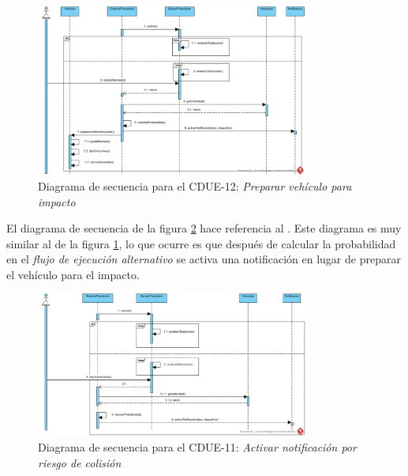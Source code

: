 \begin{figure}[h]
  \begin{center}
    \includegraphics[width=0.8\textwidth]{./img/diagramas_de_secuencia/CDUE-12.png}
  \end{center}
  \caption{Diagrama de secuencia para el CDUE-12: \textit{Preparar vehículo para impacto}}
  \label{img:prep_vehiculo_impacto}
\end{figure}

\par El diagrama de secuencia de la figura \ref{img:not_riesgo_colision} hace referencia al . Este diagrama es muy similar al de la figura \ref{img:prep_vehiculo_impacto}, lo que ocurre es que después de calcular la probabilidad en el \textit{flujo de ejecución alternativo} se activa una notificación en lugar de preparar el vehículo para el impacto.

\begin{figure}[h]
  \begin{center}
    \includegraphics[width=0.8\textwidth]{./img/diagramas_de_secuencia/CDUE-11.png}
  \end{center}
  \caption{Diagrama de secuencia para el CDUE-11: \textit{Activar notificación por riesgo de colisión}}
  \label{img:not_riesgo_colision}
\end{figure}

